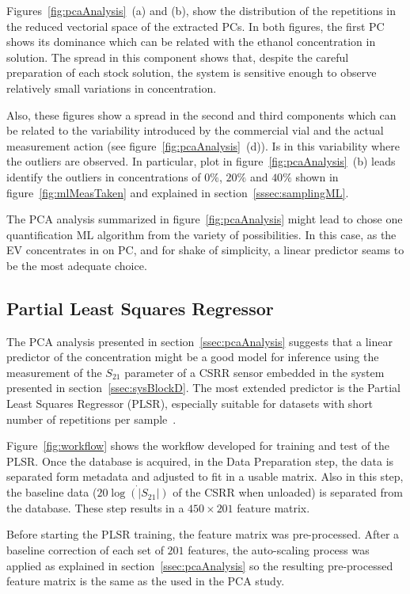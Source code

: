 \documentclass[journal,twoside,web]{ieeecolor}
\begin{document}
Figures~\ref{fig:pcaAnalysis}~(a) and (b), show the distribution of the repetitions in the reduced vectorial space of the extracted PCs. In both figures, the first PC shows its dominance which can be related with the ethanol concentration in solution. The spread in this component shows that, despite the careful preparation of each stock solution, the system is sensitive enough to observe relatively small variations in concentration. 

Also, these figures show a spread in the second and third components which can be related to the variability introduced by the commercial vial and the actual measurement action (see figure~\ref{fig:pcaAnalysis}~(d)). Is in this variability where the outliers are observed. In particular, plot in figure~\ref{fig:pcaAnalysis}~(b) leads identify the outliers in concentrations of $0\%$, $20\%$ and $40\%$ shown in figure~\ref{fig:mlMeasTaken} and explained in section~\ref{sssec:samplingML}. 

The PCA analysis summarized in figure~\ref{fig:pcaAnalysis} might lead to chose one quantification ML algorithm from the variety of possibilities. In this case, as the EV concentrates in on PC, and for shake of simplicity, a linear predictor seams to be the most adequate choice.      

\subsection{Partial Least Squares Regressor}
\label{ssec:plsRegressor}

The PCA analysis presented in section~\ref{ssec:pcaAnalysis} suggests that a linear predictor of the concentration might be a good model for inference using the measurement of the $S_{21}$ parameter of a CSRR sensor embedded in the system presented in section~\ref{ssec:sysBlockD}. The most extended predictor is the Partial Least Squares Regressor (PLSR), especially suitable for datasets with short number of repetitions per sample~\cite{Wold2001}.

Figure~\ref{fig:workflow} shows the workflow developed for training and test of the PLSR. Once the database is acquired, in the Data Preparation step, the data is separated form metadata and adjusted to fit in a usable matrix. Also in this step, the baseline data ($20\dot{\log\left(|S_{21}|\right)}$ of the CSRR when unloaded) is separated from the database. These step results in a $450\times201$ feature matrix.

Before starting the PLSR training, the feature matrix was pre-processed. After a baseline correction of each set of $201$ features, the auto-scaling process was applied as explained in section~\ref{ssec:pcaAnalysis} so the resulting pre-processed feature matrix is the same as the used in the PCA study.   
\end{document}
